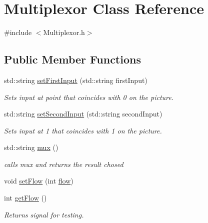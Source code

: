 \hypertarget{class_multiplexor}{}\section{Multiplexor Class Reference}
\label{class_multiplexor}


{\ttfamily \#include $<$Multiplexor.\+h$>$}

\subsection*{Public Member Functions}
\begin{DoxyCompactItemize}
\item 
\mbox{\label{class_multiplexor_a69c9a975586cc73853780b769e275763}} 
std\+::string \mbox{\hyperlink{class_multiplexor_a69c9a975586cc73853780b769e275763}{set\+First\+Input}} (std\+::string first\+Input)
\begin{DoxyCompactList}\small\item\em Set\textquotesingle{}s input at point that coincides with 0 on the picture. \end{DoxyCompactList}\item 
\mbox{\label{class_multiplexor_afcc3b61e4bb50501e5f11f81d6603641}} 
std\+::string \mbox{\hyperlink{class_multiplexor_afcc3b61e4bb50501e5f11f81d6603641}{set\+Second\+Input}} (std\+::string second\+Input)
\begin{DoxyCompactList}\small\item\em Sets input at 1 that coincides with 1 on the picture. \end{DoxyCompactList}\item 
\mbox{\label{class_multiplexor_aa6d73bfebf640401b42562534694cd02}} 
std\+::string \mbox{\hyperlink{class_multiplexor_aa6d73bfebf640401b42562534694cd02}{mux}} ()
\begin{DoxyCompactList}\small\item\em calls mux and returns the result chosed \end{DoxyCompactList}\item 
void \mbox{\hyperlink{class_multiplexor_aaf700f773d80deaa3af4cb8aec0f9b41}{set\+Flow}} (int \mbox{\hyperlink{class_multiplexor_aa38f2d5057c2c76b799fa66645662b55}{flow}})
\item 
\mbox{\label{class_multiplexor_aa2483f83fbb3c17b0ffcff36893f4314}} 
int \mbox{\hyperlink{class_multiplexor_aa2483f83fbb3c17b0ffcff36893f4314}{get\+Flow}} ()
\begin{DoxyCompactList}\small\item\em Returns signal for testing. \end{DoxyCompactList}\end{DoxyCompactItemize}
